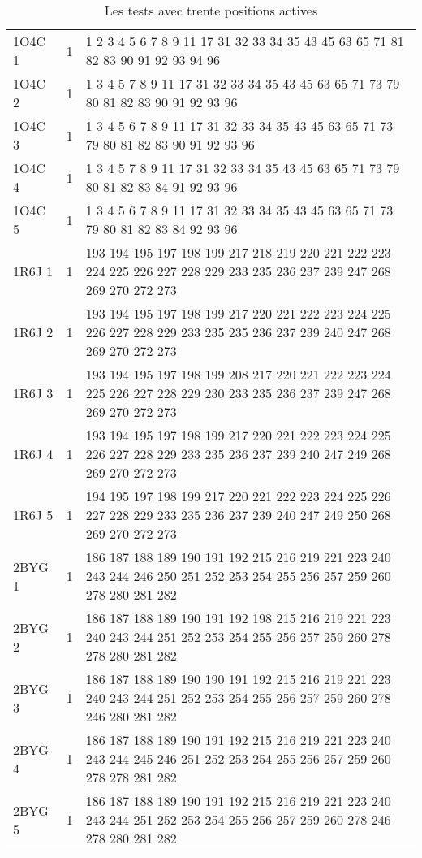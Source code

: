 \begin{table}[!htbp]
{\begin{tabular}{lll}
        1O4C 1 & 1 & 1 2 3 4 5 6 7 8 9 11 17 31 32 33 34 35 43 45 63 65 71 81 82 83 90 91 92 93 94 96\\
        1O4C 2 & 1 & 1 3 4 5 7 8 9 11 17 31 32 33 34 35 43 45 63 65 71 73 79 80 81 82 83 90 91 92 93 96\\
        1O4C 3 & 1 & 1 3 4 5 6 7 8 9 11 17 31 32 33 34 35 43 45 63 65 71 73 79 80 81 82 83 90 91 92 93 96 \\
        1O4C 4 & 1 & 1 3 4 5 7 8 9 11 17 31 32 33 34 35 43 45 63 65 71 73 79 80 81 82 83 84 91 92 93 96 \\
        1O4C 5 & 1 & 1 3 4 5 6 7 8 9 11 17 31 32 33 34 35 43 45 63 65 71 73 79 80 81 82 83 84 92 93 96 \\
        1R6J 1 & 1 & 193 194 195 197 198 199 217 218 219 220 221 222 223 224 225 226 227 228 229 233 235 236 237 239 247 268 269 270 272 273 \\
        1R6J 2 & 1 & 193 194 195 197 198 199 217 220 221 222 223 224 225 226 227 228 229 233 235 235 236 237 239 240 247 268 269 270 272 273 \\
        1R6J 3 & 1 & 193 194 195 197 198 199 208 217 220 221 222 223 224 225 226 227 228 229 230 233 235 236 237 239 247 268 269 270 272 273 \\
        1R6J 4 & 1 & 193 194 195 197 198 199 217 220 221 222 223 224 225 226 227 228 229 233 235 236 237 239 240 247 249 268 269 270 272 273 \\
        1R6J 5 & 1 & 194 195 197 198 199 217 220 221 222 223 224 225 226 227 228 229 233 235 236 237 239 240 247 249 250 268 269 270 272 273 \\
        2BYG 1 & 1 & 186 187 188 189 190 191 192 215 216 219 221 223 240 243 244 246 250 251 252 253 254 255 256 257 259 260 278 280 281 282 \\
        2BYG 2 & 1 & 186 187 188 189 190 191 192 198 215 216 219 221 223 240 243 244 251 252 253 254 255 256 257 259 260 278 278 280 281 282 \\
        2BYG 3 & 1 & 186 187 188 189 190 190 191 192 215 216 219 221 223 240 243 244 251 252 253 254 255 256 257 259 260 278 246 280 281 282 \\
        2BYG 4 & 1 & 186 187 188 189 190 191 192 215 216 219 221 223 240 243 244 245 246 251 252 253 254 255 256 257 259 260 278 278 281 282 \\
        2BYG 5 & 1 & 186 187 188 189 190 191 192 215 216 219 221 223 240 243 244 251 252 253 254 255 256 257 259 260 278 246 278 280 281 282 \\

        \bottomrule

      \end{tabular}   
}   
      \caption{Les tests avec trente positions actives}
\label{tab:test30}      
    \end{table}





